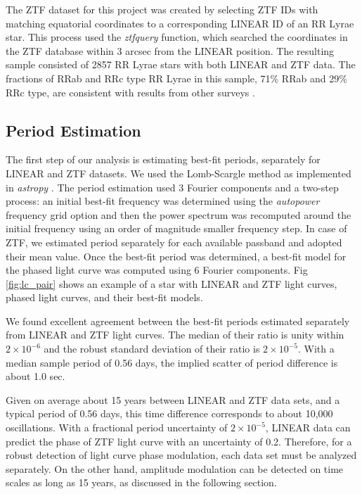The ZTF dataset for this project was created by selecting ZTF IDs with matching equatorial coordinates to a corresponding
LINEAR ID of an RR Lyrae star. This process used the {\it ztfquery} function, which searched the coordinates in the ZTF database
within 3 arcsec from the LINEAR position. The resulting sample consisted of 2857 RR Lyrae stars with both LINEAR and ZTF data.
The fractions of RRab and RRc type RR Lyrae in this sample, 71\% RRab and 29\% RRc type, are consistent with results from
other surveys \citep[e.g.,][]{2010ApJ...708..717S}. 


\subsection{Period Estimation}


The first step of our analysis is estimating best-fit periods, separately for LINEAR and ZTF datasets. 
We used the Lomb-Scargle method \citep{2015zndo.....14833V} as implemented in {\it astropy}
\citep{2018AJ....156..123A}. The period estimation used 3 Fourier components and a two-step process: an initial
best-fit frequency was determined using the {\it autopower} frequency grid option and then the power spectrum was
recomputed around the initial frequency using an order of magnitude smaller frequency step. In case of ZTF, we
estimated period separately for each available passband and adopted their mean value. Once the best-fit
period was determined, a best-fit model for the phased light curve was computed using 6 Fourier components.
Fig \ref{fig:lc_pair} shows an example of a star with LINEAR and ZTF light curves, phased light curves, and their
best-fit models.  

We found excellent agreement between the best-fit periods estimated separately from LINEAR and ZTF light curves. 
The median of their ratio is unity within $2\times10^{-6}$ and the robust standard deviation of their ratio is
$2\times10^{-5}$. With a median sample period of 0.56 days, the implied scatter of period difference is about 1.0 sec.  

Given on average about 15 years between LINEAR and ZTF data sets, and a typical period of 0.56 days, this time
difference corresponds to about 10,000 oscillations. With a fractional period uncertainty of $2\times10^{-5}$,
LINEAR data can predict the phase of ZTF light curve with an uncertainty of 0.2. Therefore, for a robust detection
of light curve phase modulation, each data set must be analyzed separately. On the other hand, amplitude
modulation can be detected on time scales as long as 15 years, as discussed in the following section. 



